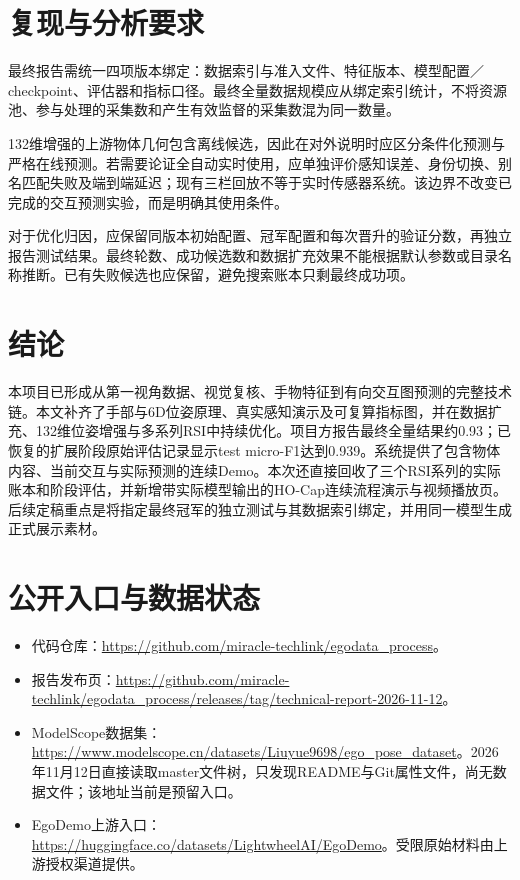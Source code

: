 \section{复现与分析要求}
最终报告需统一四项版本绑定：数据索引与准入文件、特征版本、模型配置／checkpoint、评估器和指标口径。最终全量数据规模应从绑定索引统计，不将资源池、参与处理的采集数和产生有效监督的采集数混为同一数量。

132维增强的上游物体几何包含离线候选，因此在对外说明时应区分条件化预测与严格在线预测。若需要论证全自动实时使用，应单独评价感知误差、身份切换、别名匹配失败及端到端延迟；现有三栏回放不等于实时传感器系统。该边界不改变已完成的交互预测实验，而是明确其使用条件。

对于优化归因，应保留同版本初始配置、冠军配置和每次晋升的验证分数，再独立报告测试结果。最终轮数、成功候选数和数据扩充效果不能根据默认参数或目录名称推断。已有失败候选也应保留，避免搜索账本只剩最终成功项。

\section{结论}
本项目已形成从第一视角数据、视觉复核、手物特征到有向交互图预测的完整技术链。本文补齐了手部与6D位姿原理、真实感知演示及可复算指标图，并在数据扩充、132维位姿增强与多系列RSI中持续优化。项目方报告最终全量结果约0.93；已恢复的扩展阶段原始评估记录显示test micro-F1达到0.939。系统提供了包含物体内容、当前交互与实际预测的连续Demo。本次还直接回收了三个RSI系列的实际账本和阶段评估，并新增带实际模型输出的HO-Cap连续流程演示与视频播放页。后续定稿重点是将指定最终冠军的独立测试与其数据索引绑定，并用同一模型生成正式展示素材。

\FloatBarrier\medskip
{}
{\small}
\clearpage\appendix
\section{公开入口与数据状态}
\begin{itemize}
\item 代码仓库：\url{https://github.com/miracle-techlink/egodata_process}。
\item 报告发布页：\url{https://github.com/miracle-techlink/egodata_process/releases/tag/technical-report-2026-11-12}。
\item ModelScope数据集：\url{https://www.modelscope.cn/datasets/Liuyue9698/ego_pose_dataset}。2026年11月12日直接读取master文件树，只发现README与Git属性文件，尚无数据文件；该地址当前是预留入口。
\item EgoDemo上游入口：\url{https://huggingface.co/datasets/LightwheelAI/EgoDemo}。受限原始材料由上游授权渠道提供。
\end{itemize}

